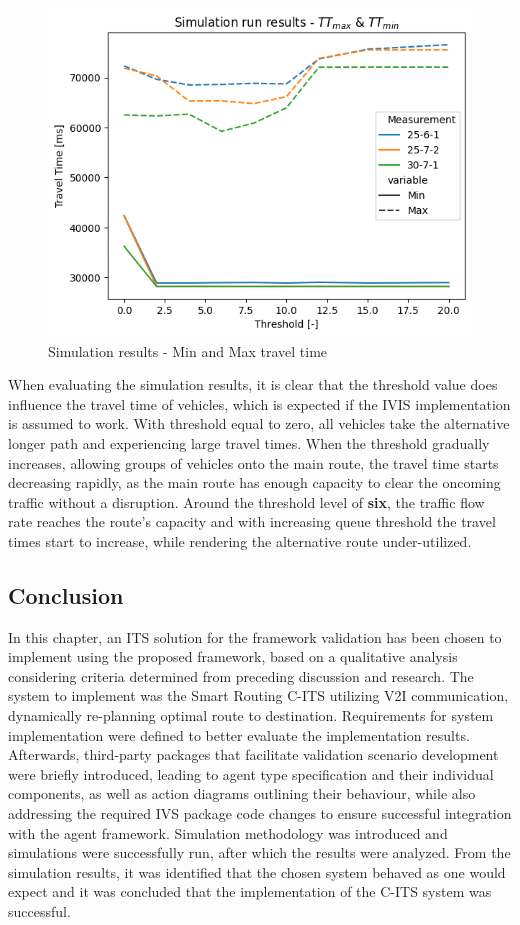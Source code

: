\documentclass[main.tex]{subfiles}
\begin{document}
\begin{figure}[htbp]
    \centering
    \includegraphics[width=.8\textwidth]{MinMax.png}
    \caption{Simulation results - Min and Max travel time}
    \label{fig-sim-minmax}
\end{figure}

When evaluating the simulation results, it is clear that the threshold value does influence the
travel time of vehicles, which is expected if the IVIS implementation is assumed to work. With
threshold equal to zero, all vehicles take the alternative longer path and experiencing large
travel times. When the threshold gradually increases, allowing groups of vehicles onto the 
main route, the travel time starts decreasing rapidly, as the main route has enough capacity to clear 
the oncoming traffic without a disruption. Around the threshold level of \textbf{six}, the traffic flow 
rate reaches the route's capacity and with increasing queue threshold the travel times start to
increase, while rendering the alternative route under-utilized.

\clearpage 

\subsection{Conclusion}

In this chapter, an ITS solution for the framework validation has been chosen to implement
using the proposed framework, based on a qualitative analysis considering criteria determined
from preceding discussion and research. The system to implement was the Smart Routing C-ITS
utilizing V2I communication, dynamically re-planning optimal route to destination. Requirements
for system implementation were defined to better evaluate the implementation results.
Afterwards, third-party packages that facilitate validation scenario development were briefly
introduced, leading to agent type specification and their individual components, as well as
action diagrams outlining their behaviour, while also addressing the required IVS package code
changes to ensure successful integration with the agent framework. Simulation methodology was
introduced and simulations were successfully run, after which the results were analyzed. From the 
simulation results, it was identified that the chosen system behaved as one would expect and it
was concluded that the implementation of the C-ITS system was successful. 
\end{document}
